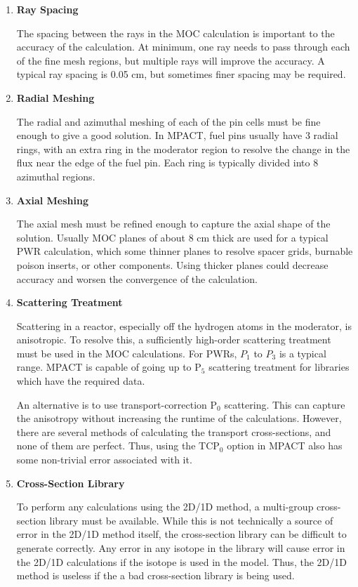 \begin{enumerate}[leftmargin=*]
  \item \textbf{Ray Spacing}
  
  The spacing between the rays in the MOC calculation is important to the accuracy of the calculation.  At minimum, one ray needs to pass through each of the fine mesh regions, but multiple rays will improve the accuracy.  A typical ray spacing is 0.05 cm, but sometimes finer spacing may be required.
  
  \item \textbf{Radial Meshing}
  
  The radial and azimuthal meshing of each of the pin cells must be fine enough to give a good solution.  In MPACT, fuel pins usually have 3 radial rings, with an extra ring in the moderator region to resolve the change in the flux near the edge of the fuel pin.  Each ring is typically divided into 8 azimuthal regions.
  
  \item \textbf{Axial Meshing}
  
  The axial mesh must be refined enough to capture the axial shape of the solution.  Usually MOC planes of about 8 cm thick are used for a typical PWR calculation, which some thinner planes to resolve spacer grids, burnable poison inserts, or other components.  Using thicker planes could decrease accuracy and worsen the convergence of the calculation.
  
  \item \textbf{Scattering Treatment}
  
  Scattering in a reactor, especially off the hydrogen atoms in the moderator, is anisotropic.  To resolve this, a sufficiently high-order scattering treatment must be used in the MOC calculations.  For PWRs, $P_1$ to $P_3$ is a typical range.  MPACT is capable of going up to P$_5$ scattering treatment for libraries which have the required data.
  
  An alternative is to use transport-correction P$_0$ scattering.  This can capture the anisotropy without increasing the runtime of the calculations.  However, there are several methods of calculating the transport cross-sections, and none of them are perfect.  Thus, using the TCP$_0$ option in MPACT also has some non-trivial error associated with it.
  
  \item \textbf{Cross-Section Library}
  
  To perform any calculations using the 2D/1D method, a multi-group cross-section library must be available.  While this is not technically a source of error in the 2D/1D method itself, the cross-section library can be difficult to generate correctly.  Any error in any isotope in the library will cause error in the 2D/1D calculations if the isotope is used in the model.  Thus, the 2D/1D method is useless if the a bad cross-section library is being used.
  

\end{enumerate}

